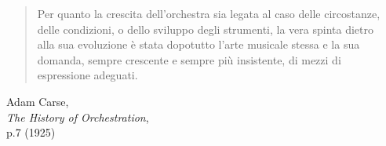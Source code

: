 \begin{frame}
    
    \begin{columns}[T]
        \begin{column}{0.7\textwidth}
			    \begin{quote}
			        Per quanto la crescita dell'orchestra sia legata al caso delle
			        circostanze, delle condizioni, o dello sviluppo degli strumenti,
			        la vera spinta dietro alla sua evoluzione \`e stata dopotutto l'arte
			        musicale stessa e la sua domanda, sempre crescente e sempre pi\`u insistente,
			        di mezzi di espressione adeguati.%
			    \end{quote}
			    \begin{flushright}
			        Adam Carse,\\\emph{The History of Orchestration},\\p.7 (1925)
			    \end{flushright}
        \end{column}
        \begin{column}{0.3\textwidth}
            \begin{center}
            \end{center}
        \end{column}
    \end{columns}

\end{frame}
  
